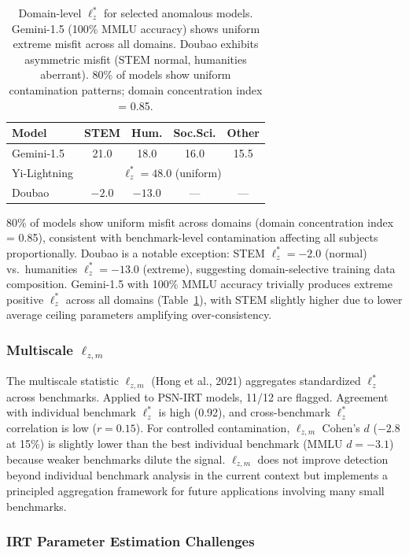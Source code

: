 \documentclass[11pt,a4paper]{article}
\begin{document}
\begin{table}[t]
\centering
\small
\begin{tabular}{lcccc}
\toprule
\textbf{Model} & \textbf{STEM} & \textbf{Hum.} & \textbf{Soc.Sci.} & \textbf{Other} \\
\midrule
Gemini-1.5 & 21.0 & 18.0 & 16.0 & 15.5 \\
Yi-Lightning & \multicolumn{4}{c}{$\ell_z^* = 48.0$ (uniform)} \\
Doubao & $-2.0$ & $-13.0$ & --- & --- \\
\bottomrule
\end{tabular}
\caption{Domain-level $\ell_z^*$ for selected anomalous models. Gemini-1.5 (100\% MMLU accuracy) shows uniform extreme misfit across all domains. Doubao exhibits asymmetric misfit (STEM normal, humanities aberrant). 80\% of models show uniform contamination patterns; domain concentration index = 0.85.}
\label{tab:domain}
\end{table}

80\% of models show uniform misfit across domains (domain concentration index = 0.85), consistent with benchmark-level contamination affecting all subjects proportionally. Doubao is a notable exception: STEM $\ell_z^* = -2.0$ (normal) vs.\ humanities $\ell_z^* = -13.0$ (extreme), suggesting domain-selective training data composition. Gemini-1.5 with 100\% MMLU accuracy trivially produces extreme positive $\ell_z^*$ across all domains (Table~\ref{tab:domain}), with STEM slightly higher due to lower average ceiling parameters amplifying over-consistency.

\subsubsection{Multiscale $\ell_{z,m}$}

The multiscale statistic $\ell_{z,m}$ (Hong et al., 2021) aggregates standardized $\ell_z^*$ across benchmarks. Applied to PSN-IRT models, 11/12 are flagged. Agreement with individual benchmark $\ell_z^*$ is high (0.92), and cross-benchmark $\ell_z^*$ correlation is low ($r = 0.15$). For controlled contamination, $\ell_{z,m}$ Cohen's $d$ ($-2.8$ at 15\%) is slightly lower than the best individual benchmark (MMLU $d = -3.1$) because weaker benchmarks dilute the signal. $\ell_{z,m}$ does not improve detection beyond individual benchmark analysis in the current context but implements a principled aggregation framework for future applications involving many small benchmarks.

\subsubsection{IRT Parameter Estimation Challenges}\label{sec:irt_refit}
\end{document}
